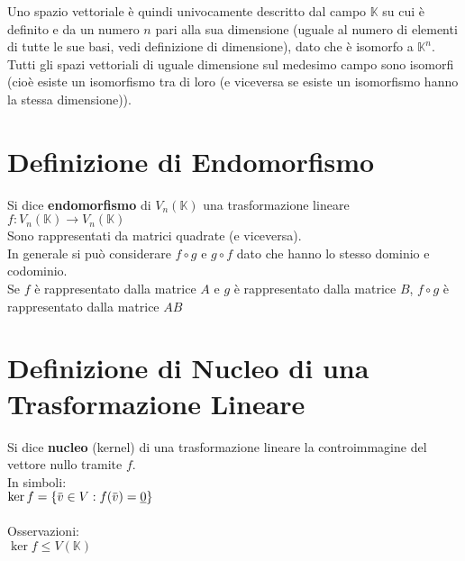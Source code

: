 \documentclass[a4paper, twoside, italian, 11pt]{book}
\newcommand{\braces}[1] {\left \{ #1 \right \}}
\newcommand{\overbar}[1] {\mkern 1.5mu\overline{\mkern-1.5mu#1\mkern-1.5mu}\mkern 1.5mu}
\newcommand{\K}{\mathbb K}
\begin{document}
\noindent
Uno spazio vettoriale è quindi univocamente descritto dal campo $\K$ su cui è definito e da un numero $n$ pari alla sua dimensione (uguale al numero di elementi di tutte le sue basi, vedi definizione di dimensione), dato che è isomorfo a $\K^n$. \\

\noindent
Tutti gli spazi vettoriali di uguale dimensione sul medesimo campo sono isomorfi (cioè esiste un isomorfismo tra di loro (e viceversa se esiste un isomorfismo hanno la stessa dimensione)).



\section{Definizione di Endomorfismo}

Si dice \textbf{endomorfismo} di $V_n(\K)$ una trasformazione lineare $f : V_n(\K) \rightarrow V_n(\K)$ \\

\noindent
Sono rappresentati da matrici quadrate (e viceversa). \\

\noindent
In generale si può considerare $f \circ g$ e $g \circ f$ dato che hanno lo stesso dominio e codominio. \\

\noindent
Se $f$ è rappresentato dalla matrice $A$ e $g$ è rappresentato dalla matrice $B$, $f \circ g$ è rappresentato dalla matrice $AB$



\section{Definizione di Nucleo di una Trasformazione Lineare}

Si dice \textbf{nucleo} (kernel) di una trasformazione lineare la controimmagine del vettore nullo tramite $f$. \\

\noindent
In simboli: \\

$\ker f = \braces{\overbar v \in V : f(\overbar v) = \underline 0}$ \\\\

\noindent
Osservazioni: \\

$\ker f \leq V(\K)$ \\
\end{document}
